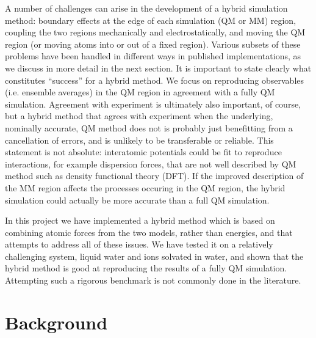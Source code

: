 \documentclass[11pt]{revtex4}
\begin{document}
A number of challenges can arise in the development of a hybrid
simulation method: boundary effects at the edge of each simulation
(QM or MM) region, coupling the two regions mechanically and
electrostatically, and moving the QM region (or moving atoms into
or out of a fixed region).  Various subsets of these problems have
been handled in different ways in published implementations, as we
discuss in more detail in the next section.  It is important to
state clearly what constitutes ``success'' for a hybrid method.  We focus
on reproducing observables (i.e. ensemble averages) in the QM region
in agreement with a fully QM simulation.  Agreement with experiment
is ultimately also important, of course, but a hybrid method that agrees with
experiment when the underlying, nominally accurate, QM method does
not is probably just benefitting from a cancellation of errors, and
is unlikely to be transferable or reliable.  This statement is not
absolute: interatomic potentials could be fit to reproduce interactions,
for example dispersion forces, that are not well described by QM
method such as density functional theory (DFT).  If the improved
description of the MM region affects the processes occuring in
the QM region, the hybrid simulation could actually be more accurate
than a full QM simulation.

In this project we have implemented a hybrid method which is based on combining atomic
forces from the two models, rather than energies, and that attempts to address all of these issues.  We have tested
it on a relatively challenging system, liquid water and ions solvated
in water, and shown that the hybrid method is good at reproducing
the results of a fully QM simulation. Attempting such a rigorous benchmark is not commonly
done in the literature.

\section{Background}
\end{document}
